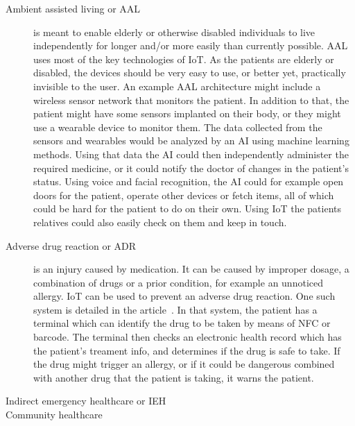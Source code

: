 \begin{description}
  \item[Ambient assisted living or AAL] is meant to enable elderly or otherwise
    disabled individuals to live independently for longer and/or more easily
    than currently possible. AAL uses most of the key technologies of IoT. As
    the patients are elderly or disabled, the devices should be very easy to
    use, or better yet, practically invisible to the user. An example AAL
    architecture might include a wireless sensor network that monitors the
    patient. In addition to that, the patient might have some sensors implanted
    on their body, or they might use a wearable device to monitor them. The
    data collected from the sensors and wearables would be analyzed by an AI
    using machine learning methods. Using that data the AI could then
    independently administer the required medicine, or it could notify the
    doctor of changes in the patient's status. Using voice and facial
    recognition, the AI could for example open doors for the patient, operate
    other devices or fetch items, all of which could be hard for the patient to
    do on their own. Using IoT the patients relatives could also easily check
    on them and keep in touch.~\cite{Istepanian2011}

  \item[Adverse drug reaction or ADR] is an injury caused by medication. It can
    be caused by improper dosage, a combination of drugs or a prior condition,
    for example an unnoticed allergy. IoT can be used to prevent an adverse
    drug reaction. One such system is detailed in the article~\cite{Jara2010}.
    In that system, the patient has a terminal which can identify the drug to
    be taken by means of NFC or barcode. The terminal then checks an electronic
    health record which has the patient's treament info, and determines if the
    drug is safe to take. If the drug might trigger an allergy, or if it could
    be dangerous combined with another drug that the patient is taking, it
    warns the patient.

  \item[Indirect emergency healthcare or IEH] 

  \item[Community healthcare] 

\end{description}
